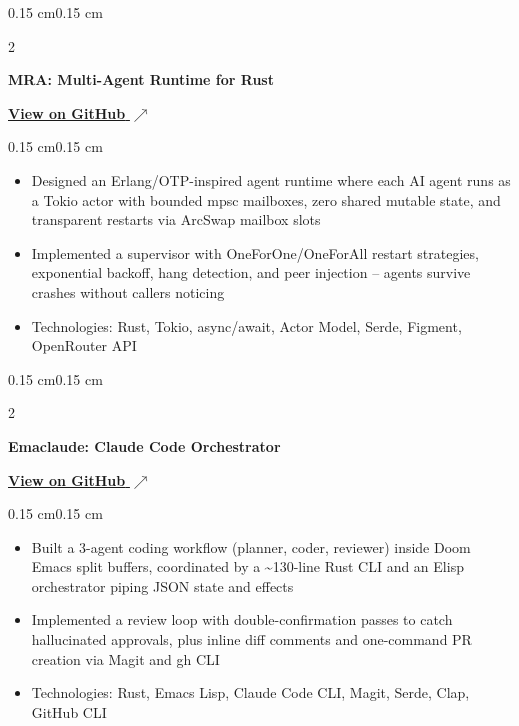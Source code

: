 \documentclass[10pt, letterpaper]{article}
\newcommand{\githublink}[2]{\href{#1}{#2 $\nearrow$}}
\newenvironment{highlights}{
    \begin{itemize}[
        topsep=0.08 cm,
        parsep=0.05 cm,
        partopsep=0pt,
        itemsep=0pt,
        leftmargin=0.4 cm
    ]
}{
    \end{itemize}
}
\newenvironment{onecolentry}{
    \begin{adjustwidth}{0.15 cm}{0.15 cm}
}{
    \end{adjustwidth}
}
\newenvironment{twocolentry}[2][]{
    \onecolentry
    \def\secondColumn{#2}
    \setcolumnwidth{\fill, 4.5 cm}
    \begin{paracol}{2}
}{
    \switchcolumn \raggedleft \secondColumn
    \end{paracol}
    \endonecolentry
}
\begin{document}
        \begin{twocolentry}{
            \githublink{https://github.com/yuann3/mra}{\textbf{View on GitHub}}
        }
            \textbf{MRA: Multi-Agent Runtime for Rust}
        \end{twocolentry}
        \vspace{0.08 cm}
        \begin{onecolentry}
            \begin{highlights}
                \item Designed an Erlang/OTP-inspired agent runtime where each AI agent runs as a Tokio actor with bounded mpsc mailboxes, zero shared mutable state, and transparent restarts via ArcSwap mailbox slots
                \item Implemented a supervisor with OneForOne/OneForAll restart strategies, exponential backoff, hang detection, and peer injection -- agents survive crashes without callers noticing
                \item Technologies: Rust, Tokio, async/await, Actor Model, Serde, Figment, OpenRouter API
            \end{highlights}
        \end{onecolentry}

        \vspace{0.15 cm}

        \begin{twocolentry}{
            \githublink{https://github.com/yuann3/emaclaude}{\textbf{View on GitHub}}
        }
            \textbf{Emaclaude: Claude Code Orchestrator}
        \end{twocolentry}
        \vspace{0.08 cm}
        \begin{onecolentry}
            \begin{highlights}
                \item Built a 3-agent coding workflow (planner, coder, reviewer) inside Doom Emacs split buffers, coordinated by a \textasciitilde130-line Rust CLI and an Elisp orchestrator piping JSON state and effects
                \item Implemented a review loop with double-confirmation passes to catch hallucinated approvals, plus inline diff comments and one-command PR creation via Magit and gh CLI
                \item Technologies: Rust, Emacs Lisp, Claude Code CLI, Magit, Serde, Clap, GitHub CLI
            \end{highlights}
        \end{onecolentry}
\end{document}
